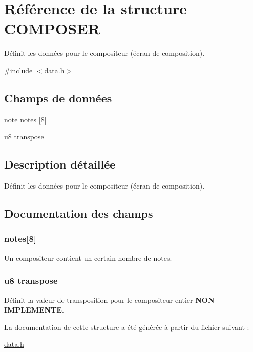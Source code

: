 \hypertarget{struct_c_o_m_p_o_s_e_r}{
\section{Référence de la structure COMPOSER}
\label{struct_c_o_m_p_o_s_e_r}
}


Définit les données pour le compositeur (écran de composition).  




{\ttfamily \#include $<$data.h$>$}

\subsection*{Champs de données}
\begin{DoxyCompactItemize}
\item 
\hyperlink{struct_n_o_t_e}{note} \hyperlink{struct_c_o_m_p_o_s_e_r_a9107f192a1f0c96f4bc8aa34af253abf}{notes} \mbox{[}8\mbox{]}
\item 
u8 \hyperlink{struct_c_o_m_p_o_s_e_r_a841401a367ef1cd53370b5c66363bdc9}{transpose}
\end{DoxyCompactItemize}


\subsection{Description détaillée}
Définit les données pour le compositeur (écran de composition). 

\subsection{Documentation des champs}
\hypertarget{struct_c_o_m_p_o_s_e_r_a9107f192a1f0c96f4bc8aa34af253abf}{
\subsubsection[{notes}]{ {\bf notes}\mbox{[}8\mbox{]}}}
\label{struct_c_o_m_p_o_s_e_r_a9107f192a1f0c96f4bc8aa34af253abf}
Un compositeur contient un certain nombre de notes. \hypertarget{struct_c_o_m_p_o_s_e_r_a841401a367ef1cd53370b5c66363bdc9}{
\subsubsection[{transpose}]{\setlength{\rightskip}{0pt plus 5cm}u8 {\bf transpose}}}
\label{struct_c_o_m_p_o_s_e_r_a841401a367ef1cd53370b5c66363bdc9}
Définit la valeur de transposition pour le compositeur entier {\bfseries NON IMPLEMENTE}. 

La documentation de cette structure a été générée à partir du fichier suivant :\begin{DoxyCompactItemize}
\item 
\hyperlink{data_8h}{data.h}\end{DoxyCompactItemize}
